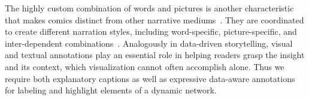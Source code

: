 













The highly custom combination of words and pictures is another characteristic that makes comics distinct from other narrative mediums~\cite{saraceni2003language}. 
They are coordinated to create different narration styles, including word-specific, picture-specific, and inter-dependent combinations~\cite{mccloud1993understanding}. 
Analogously in data-driven storytelling, visual and textual annotations play an essential role in helping readers grasp the insight and its context, which visualization cannot often accomplish alone. Thus we require both explanatory captions as well as expressive data-aware annotations for labeling and highlight elements of a dynamic network. 



